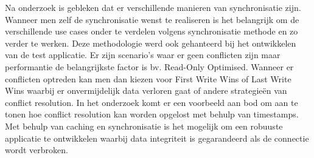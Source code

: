 Na onderzoek is gebleken dat er verschillende manieren van synchronisatie zijn.  Wanneer men zelf de synchronisatie wenst te realiseren is het belangrijk om de verschillende use cases onder te verdelen volgens synchronisatie methode en zo verder te werken. Deze methodologie werd ook gehanteerd bij het ontwikkelen van de test applicatie. Er zijn scenario's waar er geen conflicten zijn maar performantie de belangrijkste factor is bv. Read-Only Optimised. Wanneer er conflicten optreden kan men dan kiezen voor First Write Wins of Last Write Wins waarbij er onvermijdelijk data verloren gaat of andere strategie\"en van conflict resolution. In het onderzoek komt er een voorbeeld aan bod om aan te tonen hoe conflict resolution kan worden opgelost met behulp van timestamps. Met behulp van caching en synchronisatie is het mogelijk om een robuuste applicatie te ontwikkelen waarbij data integriteit is gegarandeerd als de connectie wordt verbroken.